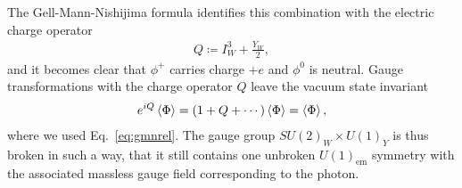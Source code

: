  The
Gell-Mann-Nishijima formula identifies this combination with the
electric charge operator
\begin{align}\label{eq:GMN}
  Q\coloneqq I^3_W+\frac{Y_W}{2},
\end{align}
and it becomes clear that $\phi^+$ carries charge
 $+e$ and $\phi^0$ is neutral. 
Gauge transformations with the charge operator $Q$ leave the vacuum state invariant
\begin{align}
   e^{iQ}\expval{\Phi} =( 1 + Q + \cdots)\expval{\Phi} = \expval{\Phi},
\end{align}
where we used Eq.~\eqref{eq:gmnrel}. The gauge group $SU(2)_{W}\times
U(1)_Y$ is thus broken in such a way, that it still contains one
unbroken $U(1)_{\text{em}}$ symmetry with the associated massless gauge field corresponding to the photon.


